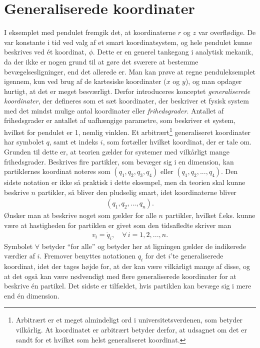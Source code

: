 \section{Generaliserede koordinater}
I eksemplet med pendulet fremgik det, at koordinaterne $r$ og $z$ var overflødige. De var konstante i tid ved valg af et smart koordinatsystem, og hele pendulet kunne beskrives ved ét koordinat, $\phi$. Dette er en generel tankegang i analytisk mekanik, da der ikke er nogen grund til at gøre det sværere at bestemme bevægelsesligninger, end det allerede er. Man kan prøve at regne penduleksemplet igennem, kun ved brug af de kartesiske koordinater ($x$ og $y$), og man opdager hurtigt, at det er meget besværligt. Derfor introduceres konceptet \emph{generaliserede koordinater}, der defineres som et sæt koordinater, der beskriver et fysisk system med det mindst mulige antal koordinater eller \emph{frihedsgrader}. Antallet af frihedsgrader er antallet af uafhængige parametre, som beskriver et system, hvilket for pendulet er 1, nemlig vinklen. Et arbitrært\footnote{Arbitrært er et meget almindeligt ord i universitetsverdenen, som betyder vilkårlig. At koordinatet er arbitrært betyder derfor, at udsagnet om det er sandt for et hvilket som helst generaliseret koordinat.} generaliseret koordinater har symbolet $q$, samt et indeks $i$, som fortæller hvilket koordinat, der er tale om. Grunden til dette er, at teorien gælder for systemer med vilkårligt mange frihedsgrader. Beskrives fire partikler, som bevæger sig i en dimension, kan partiklernes koordinat noteres som $(q_1,q_2,q_3,q_4)$ eller $(q_1,q_2,...,q_4)$. Den sidste notation er ikke så praktisk i dette eksempel, men da teorien skal kunne beskrive $n$ partikler, så bliver den pludselig smart, idet koordinaterne bliver
%
\begin{align}
	(q_1,q_2,...,q_n).
\end{align}
%
Ønsker man at beskrive noget som gælder for alle $n$ partikler, hvilket f.eks. kunne være at hastigheden for partiklen er givet som den tidsafledte skriver man
%
\begin{align}
	v_i = \dot{q}_i, \quad \forall \, i=1,2,...,n.
\end{align}
%
Symbolet $\forall$ betyder ``for alle'' og betyder her at ligningen gælder de indikerede værdier af $i$. Fremover benyttes notationen $q_i$ for det $i$'te generaliserede koordinat, idet der tages højde for, at der kan være vilkårligt mange af disse, og at det også kan være nødvendigt med flere generaliserede koordinater for at beskrive én partikel. Det sidste er tilfældet, hvis partiklen kan bevæge sig i mere end én dimension.

